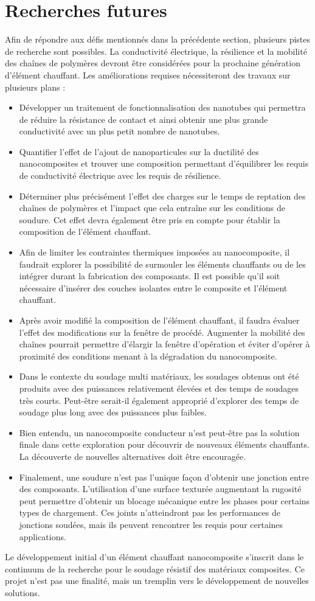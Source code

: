 \section{Recherches futures}

Afin de répondre aux défis mentionnés dans la précédente section, plusieurs pistes de recherche sont possibles.  
La conductivité électrique, la résilience et la mobilité des chaînes de polymères devront être considérées pour la prochaine génération d'élément chauffant. 
Les améliorations requises nécessiteront des travaux sur plusieurs plans : 

\begin{itemize}
	\item Développer un traitement de fonctionnalisation des nanotubes qui permettra de réduire la résistance de contact et ainsi obtenir une plus grande conductivité avec un plus petit nombre de nanotubes. 
	\item Quantifier l'effet de l'ajout de nanoparticules sur la ductilité des nanocomposites et trouver une composition permettant d'équilibrer les requis de conductivité électrique avec les requis de résilience. 
	\item Déterminer plus précisément l'effet des charges sur le temps de reptation des chaînes de polymères et l'impact que cela entraîne sur les conditions de soudure. Cet effet devra également être pris en compte pour établir la composition de l'élément chauffant. 
	\item Afin de limiter les contraintes thermiques imposées au nanocomposite, il faudrait explorer la possibilité de surmouler les éléments chauffants ou de les intégrer durant la fabrication des composants. Il est possible qu'il soit nécessaire d'insérer des couches isolantes entre le composite et l'élément chauffant. 
	\item Après avoir modifié la composition de l'élément chauffant, il faudra évaluer l'effet  des modifications sur la fenêtre de procédé. Augmenter la mobilité des chaînes pourrait permettre d'élargir la fenêtre d'opération et éviter d'opérer à proximité des conditions menant à la dégradation du nanocomposite. 
	\item Dans le contexte du soudage multi matériaux, les soudages obtenus ont été produits avec des puissances relativement élevées et des temps de soudages très courts. Peut-être serait-il également approprié d'explorer des temps de soudage plus long avec des puissances plus faibles. 
	\item Bien entendu, un nanocomposite conducteur n'est peut-être pas la solution finale dans cette exploration pour découvrir de nouveaux éléments chauffants. La découverte de nouvelles alternatives doit être encouragée. 
	\item Finalement, une soudure n'est pas l'unique façon d'obtenir une jonction entre des composants. L'utilisation d'une surface texturée augmentant la rugosité peut permettre d'obtenir un blocage mécanique entre les phases pour certains types de chargement. Ces joints n'atteindront pas les performances de jonctions soudées, mais ils peuvent rencontrer les requis pour certaines applications. 
\end{itemize}

Le développement initial d'un élément chauffant nanocomposite s'inscrit dans le continuum de la recherche pour le soudage résistif des matériaux composites. 
Ce projet n'est pas une finalité, mais un tremplin vers le développement de nouvelles solutions. 